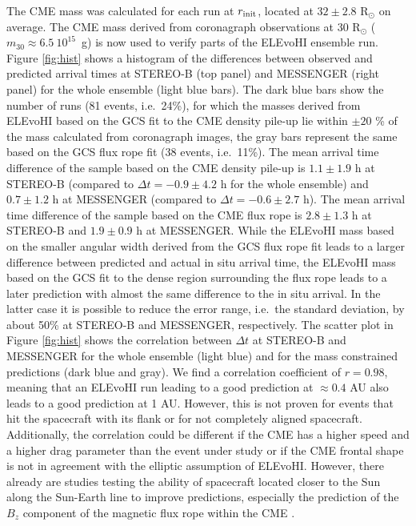 \documentclass[draft]{agujournal}
\begin{document}
The CME mass was calculated for each run at $r_{\rm init}$, located at $32 \pm 2.8$ R$_\odot$ on average. The CME mass derived from coronagraph observations at 30 R$_\odot$ ($m_{30}\approx 6.5~10^{15}$~g) is now used to verify parts of the ELEvoHI ensemble run. Figure \ref{fig:hist} shows a histogram of the differences between observed and predicted arrival times at STEREO-B (top panel) and MESSENGER (right panel) for the whole ensemble (light blue bars). The dark blue bars show the number of runs (81 events, i.e.\ 24\%), for which the masses derived from ELEvoHI based on the GCS fit to the CME density pile-up lie within $\pm 20$ \% of the mass calculated from coronagraph images, the gray bars represent the same based on the GCS flux rope fit (38 events, i.e.\ 11\%).
The mean arrival time difference of the sample based on the CME density pile-up is $1.1 \pm 1.9$ h at STEREO-B (compared to $\Delta t=-0.9 \pm 4.2$ h for the whole ensemble) and $0.7 \pm 1.2$ h at MESSENGER (compared to $\Delta t=-0.6 \pm 2.7$ h). The mean arrival time difference of the sample based on the CME flux rope is $2.8 \pm 1.3$ h at STEREO-B and $1.9 \pm 0.9$ h at MESSENGER. 
While the ELEvoHI mass based on the smaller angular width derived from the GCS flux rope fit leads to a larger difference between predicted and actual in situ arrival time, the ELEvoHI mass based on the GCS fit to the dense region surrounding the flux rope leads to a later prediction with almost the same difference to the in situ arrival. In the latter case it is possible to reduce the error range, i.e.\ the standard deviation, by about 50\% at STEREO-B and MESSENGER, respectively.
The scatter plot in Figure \ref{fig:hist} shows the correlation between $\Delta t$ at STEREO-B and MESSENGER for the whole ensemble (light blue) and for the mass constrained predictions (dark blue and gray). We find a correlation coefficient of $r=0.98$, meaning that an ELEvoHI run leading to a good prediction at $\approx 0.4$ AU also leads to a good prediction at 1 AU. However, this is not proven for events that hit the spacecraft with its flank or for not completely aligned spacecraft. Additionally, the correlation could be different if the CME has a higher speed and a higher drag parameter than the event under study or if the CME frontal shape is not in agreement with the elliptic assumption of ELEvoHI. However, there already are studies testing the ability of spacecraft located closer to the Sun along the Sun-Earth line to improve predictions, especially the prediction of the $B_z$ component of the magnetic flux rope within the CME \citep[e.g.][]{kub16}. 
\end{document}
